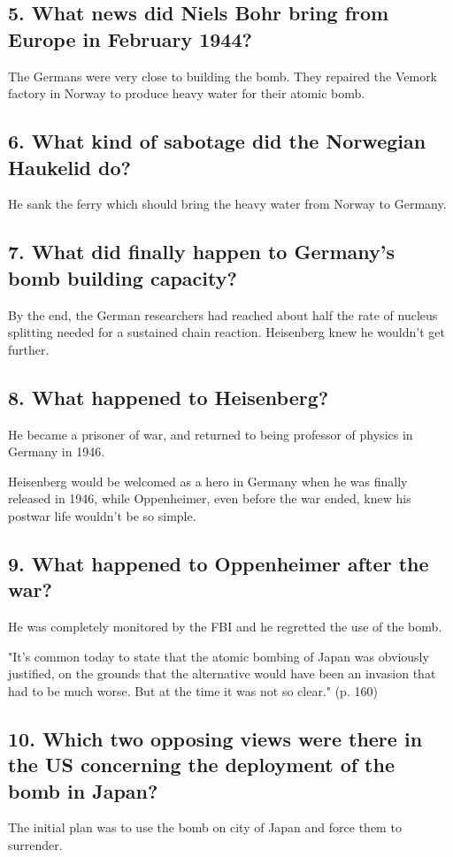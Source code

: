 \subsection*{5. What news did Niels Bohr bring from Europe in February 1944?}
The Germans were very close to building the bomb. They repaired the Vemork factory in Norway to produce heavy water for their atomic bomb.

\subsection*{6. What kind of sabotage did the Norwegian Haukelid do?}
He sank the ferry which should bring the heavy water from Norway to Germany.

\subsection*{7. What did finally happen to Germany's bomb building capacity?}
By the end, the German researchers had reached about half the rate of nucleus splitting needed for a sustained chain reaction. Heisenberg knew he wouldn't get further.

\subsection*{8. What happened to Heisenberg?}
He became a prisoner of war, and returned to being professor of physics in Germany in 1946.

Heisenberg would be welcomed as a hero in Germany when he was finally released in 1946, while Oppenheimer, even before the war ended, knew his postwar life wouldn't be so simple.

\subsection*{9. What happened to Oppenheimer after the war?}
He was completely monitored by the FBI and he regretted the use of the bomb.

"It's common today to state that the atomic bombing of Japan was obviously justified, on the grounds that the alternative would have been an invasion that had to be much worse. But at the time it was not so clear." (p. 160)

\subsection*{10. Which two opposing views were there in the US concerning the deployment of the bomb in Japan?}
The initial plan was to use the bomb on city of Japan and force them to surrender.

